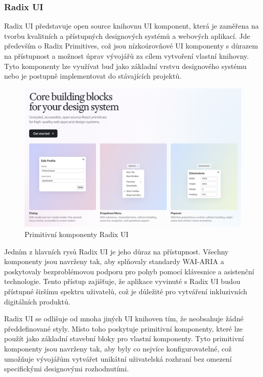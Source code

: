 \clearpage

\subsubsection{Radix UI}
Radix UI představuje open source knihovnu UI komponent, která je zaměřena na tvorbu kvalitních a přístupných designových systémů a webových aplikací.
Jde především o Radix Primitives, což jsou nízkoúrovňové UI komponenty s důrazem na přístupnost a možnost úprav vývojářů za cílem vytvoření vlastní knihovny.
Tyto komponenty lze využívat buď jako základní vrstvu designového systému nebo je postupně implementovat do stávajících projektů. \cite{RadixUIPrimitives}

\begin{figure}[H]
    \includegraphics[width=\textwidth]{images/radix-ui}
    \caption{Primitivní komponenty Radix UI} \label{picture:radix-ui}
\end{figure}

Jedním z hlavních rysů Radix UI je jeho důraz na přístupnost. Všechny komponenty jsou navrženy tak, aby splňovaly standardy WAI-ARIA a poskytovaly bezproblémovou podporu pro pohyb pomocí klávesnice a asistenční technologie. Tento přístup zajišťuje, že aplikace vyvinuté s Radix UI budou přístupné širšímu spektru uživatelů, což je důležité pro vytváření inkluzivních digitálních produktů.

Radix UI se odlišuje od mnoha jiných UI knihoven tím, že neobsahuje žádné předdefinované styly. Místo toho poskytuje primitivní komponenty, které lze použít jako základní stavební bloky pro vlastní komponenty. Tyto primitivní komponenty jsou navrženy tak, aby byly co nejvíce konfigurovatelné, což umožňuje vývojářům vytvářet unikátní uživatelská rozhraní bez omezení specifickými designovými rozhodnutími.

